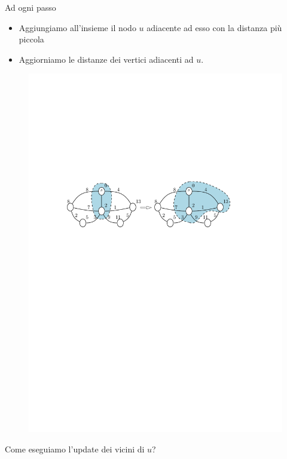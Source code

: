 \documentclass[10pt,xcolor=dvipsnames]{beamer}
\begin{document}
\begin{frame}
	\frametitle{}
	Ad ogni passo
	\begin{itemize}
		\item Aggiungiamo all'insieme il nodo $u$ adiacente ad esso con la distanza più piccola
		\item Aggiorniamo le distanze dei vertici adiacenti ad $u$.
	\end{itemize}
	\vfill

	\begin{figure}[h]
	\centering
		\includegraphics[scale=0.8]{dijkstra_update.pdf}
	\end{figure}
	\vfill
	
	Come eseguiamo l'update dei vicini di $u$?
\end{frame}
\end{document}
